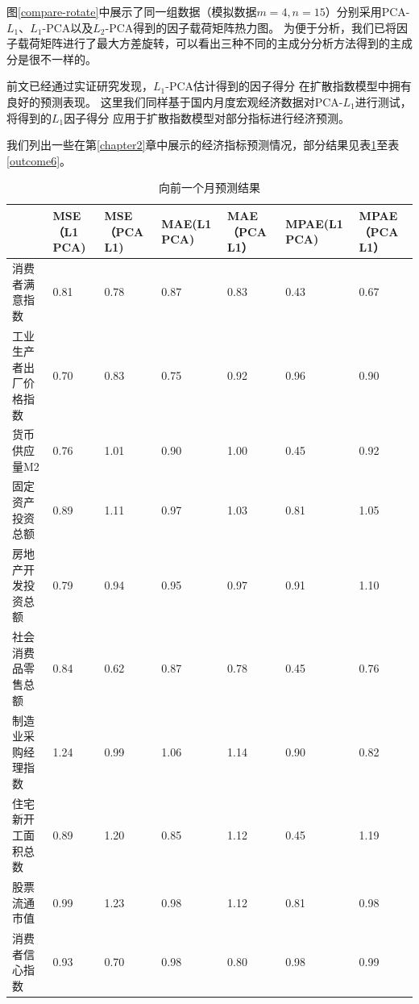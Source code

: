 图\ref{compare-rotate}中展示了同一组数据（模拟数据$m = 4, n = 15$）分别采用PCA-$L_1$、$L_1$-PCA以及$L_2$-PCA得到的因子载荷矩阵热力图。
为便于分析，我们已将因子载荷矩阵进行了最大方差旋转，可以看出三种不同的主成分分析方法得到的主成分是很不一样的。

前文已经通过实证研究发现，$L_1$-PCA估计得到的因子得分
在扩散指数模型中拥有良好的预测表现。
这里我们同样基于国内月度宏观经济数据对PCA-$L_1$进行测试，将得到的$L_1$因子得分
应用于扩散指数模型对部分指标进行经济预测。

我们列出一些在第\ref{chapter2}章中展示的经济指标预测情况，部分结果见表\ref{outcome4}至表\ref{outcome6}。

\begin{table}[H]
    \centering
    \small
    \caption{向前一个月预测结果}
    \label{outcome4}
    \begin{tabularx}{\textwidth}{lXXXXXX}
    \toprule
                 &  MSE（L1 PCA) &  MSE（PCA L1) &  MAE(L1 PCA) &  MAE（PCA L1） &  MPAE(L1 PCA) &  MPAE（PCA L1） \\ \midrule
    消费者满意指数     & 0.81            & 0.78        & 0.87            & 0.83        & 0.43             & 0.67         \\
    工业生产者出厂价格指数 & 0.70            & 0.83        & 0.75            & 0.92       & 0.96             & 0.90         \\
    货币供应量M2      & 0.76            & 1.01        & 0.90            & 1.00       & 0.45             & 0.92         \\
    固定资产投资总额  & 0.89            & 1.11        & 0.97            & 1.03        & 0.81             & 1.05         \\
    房地产开发投资总额 & 0.79            & 0.94        & 0.95            & 0.97        & 0.91             & 1.10         \\
    社会消费品零售总额 & 0.84            & 0.62        & 0.87            & 0.78        & 0.45             & 0.76         \\
    制造业采购经理指数    & 1.24            & 0.99        & 1.06            & 1.14        & 0.90             & 0.82         \\
    住宅新开工面积总数  & 0.89            & 1.20        & 0.85            & 1.12        & 0.45             & 1.19         \\
    股票流通市值     & 0.99            & 1.23        & 0.98            & 1.12        & 0.81             & 0.98         \\
    消费者信心指数     & 0.93            & 0.70        & 0.98            & 0.80        & 0.98             & 0.99         \\ \bottomrule
    \end{tabularx}
\end{table}

